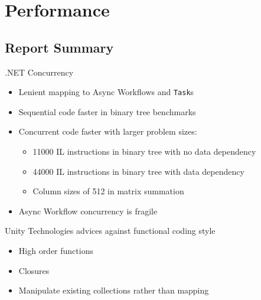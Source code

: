 \section{Performance}

\subsection{Report Summary}\label{sec:authors}
\begin{frame}{\secname}{\subsecname}
	.NET Concurrency
	\begin{itemize}
		\item<1-> Lenient mapping to Async Workflows and \texttt{Task}s %
		\item<2-> Sequential code faster in binary tree benchmarks
		\item<3-> Concurrent code faster with larger problem sizes:
		\begin{itemize}
			\item 11000 IL instructions in binary tree with no data dependency
			\item 44000 IL instructions in binary tree with data dependency
			\item Column sizes of 512 in matrix summation
		\end{itemize}
		\item<4-> Async Workflow concurrency is fragile
	\end{itemize}
\end{frame}

\begin{frame}{\secname}{\subsecname}
	Unity Technologies advices against functional coding style
	\begin{itemize}
		\item<2-> High order functions
		\item<3-> Closures
		\item<4-> Manipulate existing collections rather than mapping
	\end{itemize}
\end{frame}

